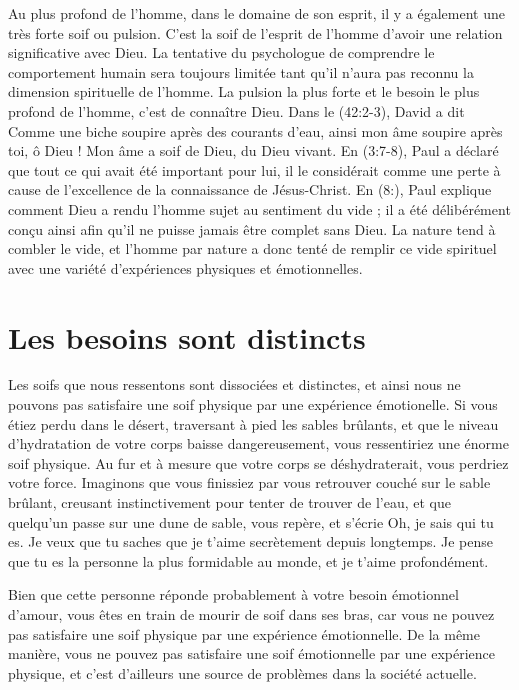 Au plus profond de l'homme, dans le domaine de son esprit,
 il y a également une très forte soif ou pulsion.
 C'est la soif de l'esprit de l'homme d'avoir une relation significative avec Dieu.
 La tentative du psychologue de comprendre le comportement humain sera toujours
 limitée tant qu'il n'aura pas reconnu la dimension spirituelle de l'homme.
 La pulsion la plus forte et le besoin le plus profond de l'homme, c'est de connaître Dieu.
 Dans le (42:2-3), David a dit\frcolon{}
 \Og Comme une biche soupire après des courants d'eau,
 ainsi mon âme soupire après toi, ô Dieu !
 Mon âme a soif de Dieu, du Dieu vivant. \Fg{}
 En (3:7-8), Paul a déclaré que tout ce qui avait été
 important pour lui, il le considérait comme une perte à cause
 de l'excellence de la connaissance de Jésus-Christ.
 En (8:), Paul explique comment Dieu a rendu l'homme
 sujet au sentiment du vide ; il a été délibérément conçu ainsi afin qu'il
 ne puisse jamais être complet sans Dieu.
 La nature tend à combler le vide, et l'homme par nature a donc tenté
 de remplir ce vide spirituel avec une variété d'expériences 
 physiques et émotionnelles.


\section{Les besoins sont distincts}

Les soifs que nous ressentons sont dissociées et distinctes,
 et ainsi nous ne pouvons pas satisfaire une soif physique
 par une expérience émotionelle. Si vous étiez perdu dans le désert,
 traversant à pied les sables brûlants, et que le niveau d'hydratation
 de votre corps baisse dangereusement, vous ressentiriez une énorme soif
 physique. Au fur et à mesure que votre corps se déshydraterait,
 vous perdriez votre force. Imaginons que vous finissiez par vous
 retrouver couché sur le sable brûlant, creusant instinctivement
 pour tenter de trouver de l'eau, et que quelqu'un passe sur une dune
 de sable, vous repère, et s'écrie\frcolon{}
 \Og Oh, je sais qui tu es. Je veux que tu saches que je t'aime secrètement depuis longtemps.
 Je pense que tu es la personne la plus formidable au monde,
 et je t'aime profondément. \Fg{}


Bien que cette personne réponde probablement à votre besoin émotionnel
 d'amour, vous êtes en train de mourir de soif dans ses bras,
 car vous ne pouvez pas satisfaire une soif physique par une
 expérience émotionnelle. De la même manière, vous ne pouvez pas satisfaire une soif
 émotionnelle par une expérience physique,
 et c'est d'ailleurs une source de problèmes dans la société actuelle.


